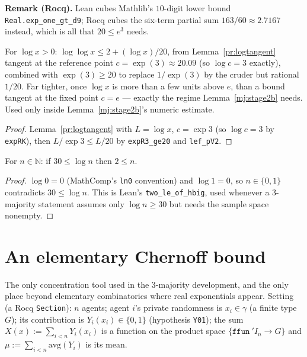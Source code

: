 \noindent\textbf{Remark (Rocq).} Lean cubes Mathlib's $10$-digit lower bound
\texttt{Real.exp\_one\_gt\_d9}; Rocq cubes the six-term partial sum
$163/60 \approx 2.7167$ instead, which is all that $20 \le e^3$ needs.

\begin{lemma}\label{pr:loglog}
  \rocqok
  For $\log x>0$: $\log\log x \le 2 + (\log x)/20$, from
  Lemma~\ref{pr:logtangent} tangent at the reference point
  $c=\exp(3)\approx20.09$ (so $\log c = 3$ exactly), combined with
  $\exp(3)\ge20$ to replace $1/\exp(3)$ by the cruder but rational $1/20$.
  Far tighter, once $\log x$ is more than a few units above $e$, than a
  bound tangent at the fixed point $c=e$ --- exactly the regime
  Lemma~\ref{mj:stage2b} needs. Used only inside Lemma~\ref{mj:stage2b}'s
  numeric estimate.
\end{lemma}
\begin{proof}
  \rocqok
  Lemma~\ref{pr:logtangent} with $L = \log x$, $c = \exp 3$ (so
  $\log c = 3$ by \texttt{expRK}), then $L/\exp 3 \le L/20$ by
  \texttt{expR3\_ge20} and \texttt{lef\_pV2}.
\end{proof}

\begin{lemma}\label{pr:lnge30}
  \rocqok
  For $n \in \mathbb{N}$: if $30 \le \log n$ then $2 \le n$.
\end{lemma}
\begin{proof}
  \rocqok
  $\log 0 = 0$ (MathComp's \texttt{ln0} convention) and $\log 1 = 0$, so
  $n \in \{0, 1\}$ contradicts $30 \le \log n$. This is Lean's
  \texttt{two\_le\_of\_hbig}, used whenever a 3-majority statement assumes
  only $\log n \ge 30$ but needs the sample space nonempty.
\end{proof}

\section{An elementary Chernoff bound}\label{pr:sec:chernoff}

The only concentration tool used in the 3-majority development, and the
only place beyond elementary combinatorics where real exponentials appear.
Setting (a Rocq \texttt{Section}): $n$ agents; agent $i$'s private
randomness is $x_i \in \gamma$ (a finite type $G$); its contribution is
$Y_i(x_i) \in \{0,1\}$ (hypothesis \texttt{Y01}); the sum $X(x) := \sum_{i<n}
Y_i(x_i)$ is a function on the product space $\{\texttt{ffun}\ 'I_n \to G\}$
and $\mu := \sum_{i<n} \mathrm{avg}(Y_i)$ is its mean.

